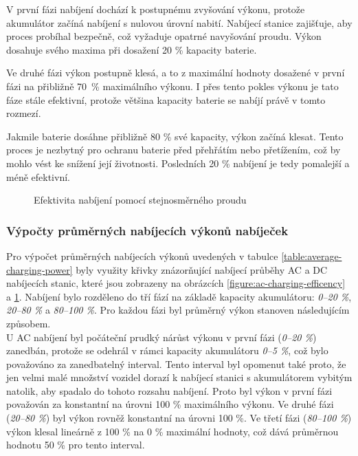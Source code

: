 \documentclass[a4paper,11pt]{article}
\begin{document}
V první fázi nabíjení dochází k postupnému zvyšování výkonu, protože akumulátor začíná nabíjení s nulovou úrovní nabití.
Nabíjecí stanice zajišťuje, aby proces probíhal bezpečně, což vyžaduje opatrné navyšování proudu. Výkon dosahuje svého
maxima při dosažení 20 \% kapacity baterie.

Ve druhé fázi výkon postupně klesá, a to z maximální hodnoty dosažené v první fázi na přibližně 70~\% maximálního výkonu. I přes tento pokles výkonu je tato fáze stále efektivní, protože většina kapacity baterie se nabíjí právě
v tomto rozmezí.

Jakmile baterie dosáhne přibližně 80 \% své kapacity, výkon začíná klesat. Tento proces je nezbytný pro ochranu baterie
před přehřátím nebo přetížením, což by mohlo vést ke snížení její životnosti. Posledních 20 \% nabíjení je tedy
pomalejší a méně efektivní. \cite{ivy_charge}

\begin{figure}[H]
    \centering
    \caption{Efektivita nabíjení pomocí stejnosměrného proudu \cite{evesco_dc_fast_charging}}
    \label{figure:dc-charging-efficency}
\end{figure}


\subsubsection{Výpočty průměrných nabíjecích výkonů nabíječek}
Pro výpočet průměrných nabíjecích výkonů uvedených v tabulce \ref{table:average-charging-power} byly využity křivky znázorňující nabíjecí průběhy AC a DC nabíjecích stanic, které jsou zobrazeny na obrázcích \ref{figure:ac-charging-efficency} a \ref{figure:dc-charging-efficency}. Nabíjení bylo rozděleno do tří fází na základě kapacity akumulátoru: \textit{0–20 \%}, \textit{20–80 \%} a \textit{80–100 \%}. Pro každou fázi byl průměrný výkon stanoven následujícím způsobem.\\

U AC nabíjení byl počáteční prudký nárůst výkonu v první fázi (\textit{0–20 \%}) zanedbán, protože se odehrál v rámci kapacity akumulátoru \textit{0–5 \%}, což bylo považováno za zanedbatelný interval. Tento interval byl opomenut také proto, že jen velmi malé množství vozidel dorazí k nabíjecí stanici s akumulátorem vybitým natolik, aby spadalo do tohoto rozsahu nabíjení. Proto byl výkon v první fázi považován za konstantní na úrovni 100 \% maximálního výkonu. Ve druhé fázi (\textit{20–80 \%}) byl výkon rovněž konstantní na úrovni 100 \%. Ve třetí fázi (\textit{80–100 \%}) výkon klesal lineárně z 100 \% na 0 \% maximální hodnoty, což dává průměrnou hodnotu 50 \% pro tento interval.\\
\end{document}
